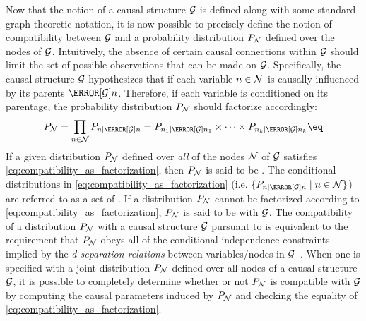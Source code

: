 \documentclass[aps, 10pt, english, twoside, pra, nofootinbib, tightenlines, longbibliography, superscriptaddress]{revtex4-1}
\begin{document}
    Now that the notion of a causal structure $\mathcal{G}$ is defined along with some standard graph-theoretic notation, it is now possible to precisely define the notion of compatibility between $\mathcal{G}$ and a probability distribution $\prob[\nodes]$ defined over the nodes of $\mathcal{G}$. Intuitively, the absence of certain causal connections within $\mathcal{G}$ should limit the set of possible observations that can be made on $\mathcal{G}$. Specifically, the causal structure $\mathcal{G}$ hypothesizes that if each variable $n \in \mathcal{N}$ is causally influenced by its parents $\Pa[\graph]{n}$. Therefore, if each variable is conditioned on its parentage, the probability distribution $\prob[\nodes]$ should factorize accordingly:
    \[ \prob[\nodes] = \prod_{n \in \nodes} \prob[n \mid \Pa[\graph]{n}] = \prob[n_1 \mid \Pa[\graph]{n_1}] \times \cdots \times \prob[n_k \mid \Pa[\graph]{n_k}] \eq \label{eq:compatibility_as_factorization}\]
    If a given distribution $\prob[\nodes]$ defined over \textit{all} of the nodes $\mathcal{N}$ of $\mathcal{G}$ satisfies \cref{eq:compatibility_as_factorization}, then $\prob[\nodes]$ is said to be . The conditional distributions in \cref{eq:compatibility_as_factorization} (i.e. $\{\prob[n \mid \Pa[\graph]{n}] \mid n \in \nodes\}$) are referred to as a set of . If a distribution $\prob[\nodes]$ cannot be factorized according to \cref{eq:compatibility_as_factorization}, $\prob[\nodes]$ is said to be  with $\mathcal{G}$. The compatibility of a distribution $\prob[\nodes]$ with a causal structure $\mathcal{G}$ pursuant to  is equivalent to the requirement that $\prob[\nodes]$ obeys all of the conditional independence constraints implied by the \textit{d-separation relations} between variables/nodes in $\mathcal{G}$~\cite{Pearl_2009}. When one is specified with a joint distribution $\prob[\nodes]$ defined over all nodes of a causal structure $\mathcal{G}$, it is possible to completely determine whether or not $\prob[\nodes]$ is compatible with $\mathcal{G}$ by computing the causal parameters induced by $\prob[\nodes]$ and checking the equality of \cref{eq:compatibility_as_factorization}.
\end{document}
